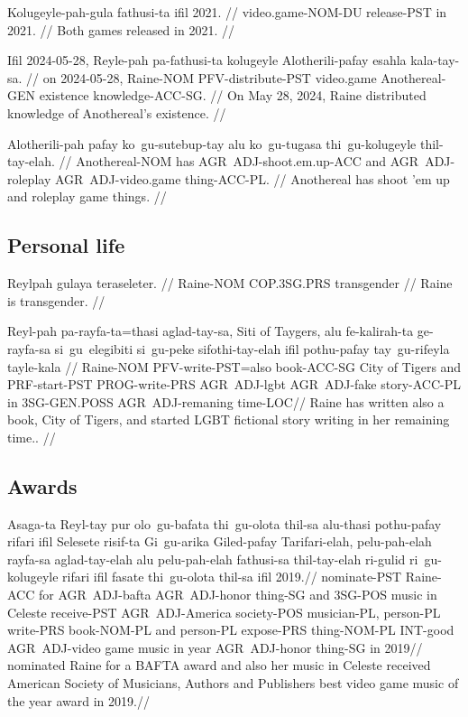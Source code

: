 \ex
\begingl
\gla Kolugeyle-pah-gula fathusi-ta ifil 2021. //
\glb video.game-NOM-DU release-PST in 2021. //
\glft Both games released in 2021. //
\endgl
\xe

\ex
\begingl
\gla Ifil 2024-05-28, Reyle-pah pa-fathusi-ta kolugeyle Alotherili-pafay esahla kala-tay-sa. //
\glb on 2024-05-28, Raine-NOM PFV-distribute-PST video.game Anothereal-GEN existence knowledge-ACC-SG. //
\glft On May 28, 2024, Raine distributed knowledge of Anothereal's existence. //
\endgl
\xe

\ex
\begingl
\gla Alotherili-pah pafay ko~gu-sutebup-tay alu ko~gu-tugasa thi~gu-kolugeyle thil-tay-elah. //
\glb Anothereal-NOM has AGR~ADJ-shoot.em.up-ACC and AGR~ADJ-roleplay AGR~ADJ-video.game thing-ACC-PL. //
\glft Anothereal has shoot 'em up and roleplay game things. //
\endgl
\xe

\subsection{Personal life}

\ex
\begingl
\gla  Reylpah   gulaya      teraseleter. //
\glb  Raine-NOM COP.3SG.PRS transgender  //
\glft Raine is transgender. //
\endgl
\xe

\ex
\begingl
\gla  Reyl-pah  pa-rayfa-ta=thasi  aglad-tay-sa, Siti of Taygers, alu fe-kalirah-ta ge-rayfa-sa    si~gu~elegibiti si~gu-peke   sifothi-tay-elah ifil pothu-pafay  tay~gu-rifeyla   tayle-kala //
\glb  Raine-NOM PFV-write-PST=also book-ACC-SG   City of Tigers   and PRF-start-PST PROG-write-PRS AGR~ADJ-lgbt    AGR~ADJ-fake story-ACC-PL     in   3SG-GEN.POSS AGR~ADJ-remaning time-LOC//  
\glft Raine has written also a book, City of Tigers, and started LGBT fictional story writing in her remaining time.. //
\endgl
\xe



\subsection{Awards}

\ex
\begingl
\gla  Asaga-ta Reyl-tay pur olo~gu-bafata thi~gu-olota thil-sa alu-thasi pothu-pafay rifari ifil Selesete risif-ta Gi~gu-arika Giled-pafay Tarifari-elah, pelu-pah-elah rayfa-sa aglad-tay-elah alu pelu-pah-elah fathusi-sa thil-tay-elah ri-gulid ri~gu-kolugeyle rifari ifil fasate thi~gu-olota thil-sa ifil 2019.//
\glb  nominate-PST Raine-ACC for AGR~ADJ-bafta AGR~ADJ-honor thing-SG and 3SG-POS music in Celeste receive-PST AGR~ADJ-America society-POS  musician-PL, person-PL write-PRS book-NOM-PL and person-PL expose-PRS thing-NOM-PL INT-good AGR~ADJ-video game music in year AGR~ADJ-honor thing-SG in 2019//
\glft nominated Raine for a BAFTA award and also her music in Celeste received American Society of Musicians, Authors and Publishers best video game music of the year award in 2019.//
\endgl
\xe

